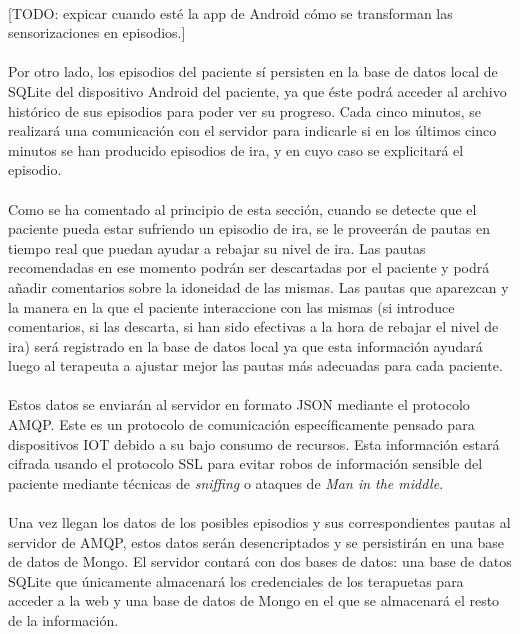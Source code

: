 \paragraph{}
[TODO: expicar cuando esté la app de Android cómo se transforman las sensorizaciones en episodios.]

\paragraph{}
Por otro lado, los episodios del paciente sí persisten en la base de datos local de SQLite del dispositivo Android del paciente, ya que éste podrá acceder al archivo histórico de sus episodios para poder ver su progreso. Cada cinco minutos, se realizará una comunicación con el servidor para indicarle si en los últimos cinco minutos se han producido episodios de ira, y en cuyo caso se explicitará el episodio.

\paragraph{}
Como se ha comentado al principio de esta sección, cuando se detecte que el paciente pueda estar sufriendo un episodio de ira, se le proveerán de pautas en tiempo real que puedan ayudar a rebajar su nivel de ira. Las pautas recomendadas en ese momento podrán ser descartadas por el paciente y podrá añadir comentarios sobre la idoneidad de las mismas. Las pautas que aparezcan y la manera en la que el paciente interaccione con las mismas (si introduce comentarios, si las descarta, si han sido efectivas a la hora de rebajar el nivel de ira) será registrado en la base de datos local ya que esta información ayudará luego al terapeuta a ajustar mejor las pautas más adecuadas para cada paciente.

\paragraph{}
Estos datos se enviarán al servidor en formato JSON mediante el protocolo AMQP. Este es un protocolo de comunicación específicamente pensado para dispositivos IOT debido a su bajo consumo de recursos. Esta información estará cifrada usando el protocolo SSL para evitar robos de información sensible del paciente mediante técnicas de \textit{sniffing} o ataques de \textit{Man in the middle}.

\paragraph{}
Una vez llegan los datos de los posibles episodios y sus correspondientes pautas al servidor de AMQP, estos datos serán desencriptados y se persistirán en una base de datos de Mongo. El servidor contará con dos bases de datos: una base de datos SQLite que únicamente almacenará los credenciales de los terapuetas para acceder a la web y una base de datos de Mongo en el que se almacenará el resto de la información.

